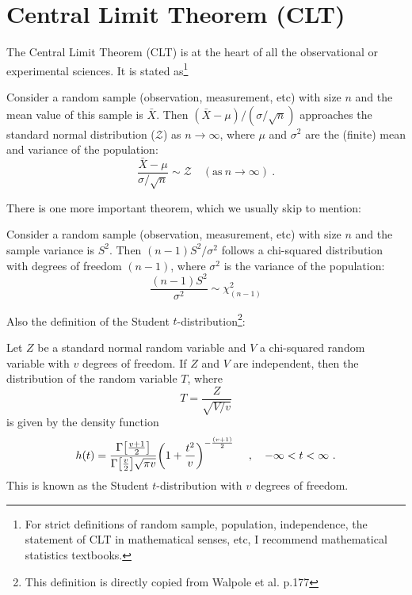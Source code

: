 \section{Central Limit Theorem (CLT)}
The Central Limit Theorem (CLT) is at the heart of all the observational or experimental sciences. It is stated as\footnote{For strict definitions of random sample, population, independence, the statement of CLT in mathematical senses, etc, I recommend mathematical statistics textbooks.}

\begin{thm} \label{thm: clt}
  Consider a random sample (observation, measurement, etc) with size $ n $ and the mean value of this sample is $ \bar{X} $. Then $ (\bar{X} - \mu) / (\sigma / \sqrt{n}) $ approaches the standard normal distribution ($ \mathcal{Z} $) as $ n \rightarrow \infty $, where $ \mu $ and $ \sigma^2 $ are the (finite) mean and variance of the population:
  \begin{equation}
    \frac{\bar{X} - \mu}{\sigma / \sqrt{n}} \sim \mathcal{Z}  \quad (\mathrm{as~} n \rightarrow \infty)~.
  \end{equation}
\end{thm}

There is one more important theorem, which we usually skip to mention:

\begin{thm} \label{thm: s and sigma}
  Consider a random sample (observation, measurement, etc) with size $ n $ and the sample variance is $ S^2 $. Then $ (n - 1) S^2 / \sigma^2 $ follows a chi-squared distribution with degrees of freedom $ (n - 1) $, where $ \sigma^2 $ is the variance of the population:
  \begin{equation}
    \frac{(n - 1) S^2}{\sigma^2 } \sim \chi^2_{(n-1)}
  \end{equation}
\end{thm}

Also the definition of the Student $ t $-distribution\footnote{This definition is directly copied from Walpole et al. p.177}:

\begin{defn}\label{def: t-distn}
  Let $ Z $ be a standard normal random variable and $ V $ a chi-squared random variable with $ v $ degrees of freedom. If $ Z $ and $ V $ are independent, then the distribution of the random variable $ T $, where
  \begin{equation}
    T = \frac{Z}{\sqrt{V /v}}
  \end{equation}
  is given by the density function
  \begin{equation}
    h(t) = \frac{\Gamma \qty[ \frac{v+1}{2} ]}{\Gamma \qty[\frac{v}{2}] \sqrt{\pi v}}
      \qty( 1 + \frac{t^2}{v} )^{-\frac{(v+1)}{2}}
    \quad ~, \quad
    -\infty < t < \infty ~.
  \end{equation}
  This is known as the Student $ t $-distribution with $ v $ degrees of freedom.
\end{defn}

